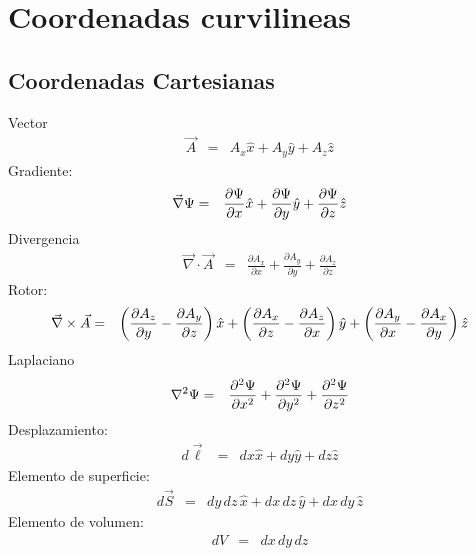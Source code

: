 \chapter{Coordenadas curvilineas}

\section{Coordenadas Cartesianas}
\noindent Vector
\begin{eqnarray}
\vec{A} 
&=& A_x{\hat x} + A_y {\hat y} + A_z {\hat z} 
\end{eqnarray}
Gradiente:
\begin{eqnarray}
\vec\nabla\Psi&=&{\partial\Psi\over\partial x} {\hat x} + {\partial\Psi\over
\partial y} {\hat y} + {\partial\Psi\over\partial z} {\hat z}
\end{eqnarray} 
Divergencia
\begin{eqnarray}
\vec\nabla\cdot\vec{A}
&=&\frac{\partial A_x}{\partial x}+\frac{\partial A_y}{\partial y}+\frac{\partial A_z}{\partial z}
\end{eqnarray} 
Rotor:
\begin{eqnarray}
\vec\nabla\times\vec{A}
&=&\left({\partial A_z\over\partial y} - {\partial A_y\over
\partial z}\right) {\hat x} + 
\left({\partial A_x\over\partial z} - {\partial A_z\over
\partial x}\right) {\hat y} + 
\left({\partial A_y\over\partial x} - {\partial A_x\over
\partial y}\right) {\hat z} 
\end{eqnarray}
Laplaciano
\begin{eqnarray}
\nabla^2\Psi
&=& {\partial^2\Psi\over\partial x^2} + {\partial^2\Psi\over\partial y^2} +
{\partial^2\Psi\over\partial z^2}
\end{eqnarray} 
Desplazamiento:
\begin{eqnarray}
 d\vec{\ell} &=& dx {\hat x} + dy {\hat y} + dz {\hat z} 
\end{eqnarray} 
Elemento de superficie:
\begin{eqnarray}
 d\vec{S} &=& dy\,dz\, {\hat x} + dx\,dz\, {\hat y} +
dx\,dy\, {\hat z}
\end{eqnarray}
Elemento de volumen:
\begin{eqnarray}
 dV &=& dx\,dy\,dz 
\end{eqnarray} 

